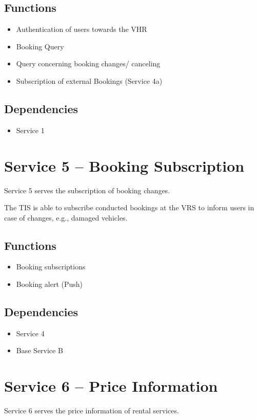 \subsection*{Functions}
\begin{itemize}
\item Authentication of users towards the VHR 
\item Booking Query
\item Query concerning booking changes/ canceling
\item Subscription of external Bookings (Service 4a)
\end{itemize}

\subsection*{Dependencies}
\begin{itemize}
\item Service 1
\end{itemize}

\section{Service 5 -- Booking Subscription}
\label{sec:Hierachiemodell:Dienst5}
Service 5 serves the subscription of booking changes.

The TIS is able to subscribe conducted bookings at the VRS to inform users in case of changes, e.g., damaged vehicles.
\subsection*{Functions}
\begin{itemize}
\item Booking subscriptions 
\item Booking alert (Push)
\end{itemize}

\subsection*{Dependencies}
\begin{itemize}
\item Service 4
\item Base Service B
\end{itemize}

\section{Service 6 -- Price Information}
\label{sec:Hierachiemodell:Dienst6}
Service 6 serves the price information of rental services.

